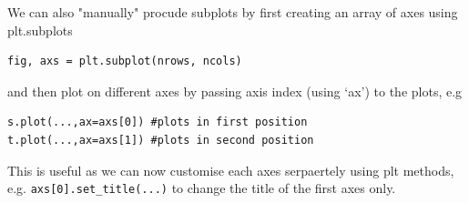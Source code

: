 \documentclass[8pt]{extarticle}
\newcommand{\heading}[1]{%
    \noindent
    \rule{\linewidth}{0.4pt}
    \begin{center}
        \vspace{-1ex}
        \textbf{#1}        
        \vspace{-2.5ex}
    \end{center}
    \rule{\linewidth}{0.4pt}
}
\begin{document}
\begin{multicols}{4}
We can also "manually" procude subplots by first creating an array of axes using plt.subplots
\begin{lstlisting}[style=Python]
fig, axs = plt.subplot(nrows, ncols)
\end{lstlisting}
and then plot on different axes by passing axis index (using `ax') to the plots, e.g
\begin{lstlisting}[style=Python]
s.plot(...,ax=axs[0]) #plots in first position
t.plot(...,ax=axs[1]) #plots in second position
\end{lstlisting}
This is useful as we can now customise each axes serpaertely using plt methods, e.g. \lstinline[style=Python]!axs[0].set_title(...)! to change the title of the first axes only.






\end{multicols}


\end{document}

